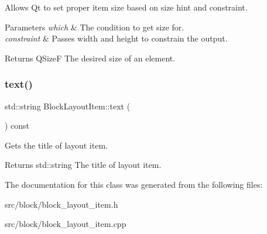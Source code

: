 Allows Qt to set proper item size based on size hint and constraint. 


\begin{DoxyParams}{Parameters}
{\em which} & The condition to get size for. \\
\hline
{\em constraint} & Passes width and height to constrain the output. \\
\hline
\end{DoxyParams}
\begin{DoxyReturn}{Returns}
Q\+SizeF The desired size of an element. 
\end{DoxyReturn}
\mbox{\label{class_block_layout_item_a374055c252f6532b80b31d065ebf1a11}} 
\subsubsection{\texorpdfstring{text()}{text()}}
{\footnotesize\ttfamily std\+::string Block\+Layout\+Item\+::text (\begin{DoxyParamCaption}{ }\end{DoxyParamCaption}) const\hspace{0.3cm}{\ttfamily [inline]}}



Gets the title of layout item. 

\begin{DoxyReturn}{Returns}
std\+::string The title of layout item. 
\end{DoxyReturn}


The documentation for this class was generated from the following files\+:\begin{DoxyCompactItemize}
\item 
src/block/block\+\_\+layout\+\_\+item.\+h\item 
src/block/block\+\_\+layout\+\_\+item.\+cpp\end{DoxyCompactItemize}

